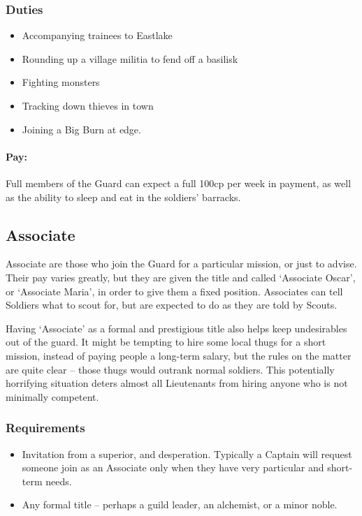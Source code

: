 \begin{multicols}{2}
\begin{itemize}
\end{itemize}

\subsubsection{Duties}

\begin{itemize}
  \item
  Accompanying trainees to Eastlake
  \item
  Rounding up a village militia to fend off a basilisk
  \item
  Fighting monsters
  \item
  Tracking down thieves in town
  \item
  Joining a Big Burn at \gls{edge}.
\end{itemize}

\paragraph{Pay:}
Full members of the Guard can expect a full 100cp per week in payment, as well as the ability to sleep and eat in the soldiers' barracks.

\subsection{Associate}
\label{ngAssociate}

Associate are those who join the Guard for a particular mission, or just to advise.
Their pay varies greatly, but they are given the title and called `Associate Oscar', or `Associate Maria', in order to give them a fixed position.
Associates can tell Soldiers what to scout for, but are expected to do as they are told by Scouts.

Having `Associate' as a formal and prestigious title also helps keep undesirables out of the \gls{guard}.
It might be tempting to hire some local thugs for a short mission, instead of paying people a long-term salary, but the rules on the matter are quite clear -- those thugs would outrank normal soldiers.
This potentially horrifying situation deters almost all Lieutenants from hiring anyone who is not minimally competent.

\subsubsection{Requirements}

\begin{itemize}
  \item
  Invitation from a superior, and desperation.
  Typically a Captain will request someone join as an Associate only when they have very particular and short-term needs.
  \item
  Any formal title -- perhaps a guild leader, an alchemist, or a minor noble.
\end{itemize}


\end{multicols}
